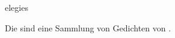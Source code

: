 \documentclass{stex}
\begin{document}
\begin{smodule}[sig=en]{elegies}
\begin{sparagraph}[style=symdoc]
Die  sind eine Sammlung von Gedichten von
.
\end{sparagraph}
\end{smodule}
\end{document}
